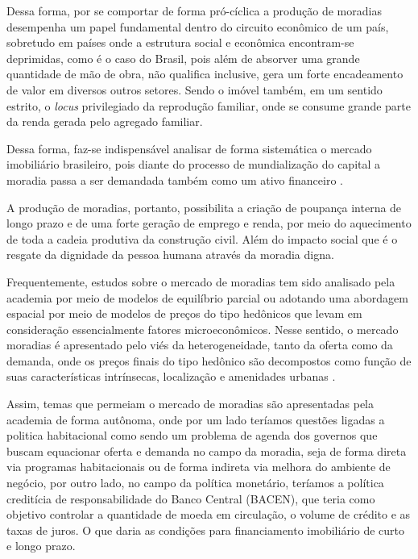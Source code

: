 Dessa forma, por se comportar de forma pró-cíclica a produção de moradias desempenha um papel fundamental dentro do circuito econômico de um país, sobretudo em países onde a estrutura social e econômica encontram-se deprimidas, como é o caso do Brasil, pois além de absorver uma grande quantidade de mão de obra, não qualifica inclusive, gera um forte encadeamento de valor em diversos outros setores. Sendo o imóvel também, em um sentido estrito, o \textit{locus} privilegiado da reprodução familiar, onde se consume grande parte da renda gerada pelo agregado familiar.

Dessa forma, faz-se indispensável analisar de forma sistemática o mercado imobiliário brasileiro, pois diante do processo de mundialização do capital \cite{CHESNAIS1996, Chesnais98} a moradia passa a ser demandada também como um ativo financeiro \cite{ROLNIK2015}.

A produção de moradias, portanto, possibilita a criação de poupança interna de longo prazo e de uma forte geração de emprego e renda, por meio do aquecimento de toda a cadeia produtiva da construção civil. Além do impacto social que é o resgate da dignidade da pessoa humana através da moradia digna.

Frequentemente, estudos sobre o mercado de moradias tem sido analisado pela academia por meio de modelos de equilíbrio parcial ou adotando uma abordagem espacial por meio de modelos de preços do tipo hedônicos que levam em consideração essencialmente fatores microeconômicos. Nesse sentido, o mercado moradias é apresentado pelo viés da heterogeneidade, tanto da oferta como da demanda, onde os preços finais do tipo hedônico são decompostos como função de suas características intrínsecas, localização e amenidades urbanas \cite{Lancaster1966}.

Assim, temas que permeiam o mercado de moradias são apresentadas pela academia de forma autônoma, onde por um lado teríamos questões ligadas a politica habitacional como sendo um problema de agenda dos governos que buscam equacionar oferta e demanda no campo da moradia, seja de forma direta via programas habitacionais ou de forma indireta via melhora do ambiente de negócio, por outro lado, no campo da política monetário, teríamos a política creditícia de responsabilidade do Banco Central (BACEN), que teria como objetivo controlar a quantidade de moeda em circulação, o volume de crédito e as taxas de juros.  O que daria as condições para financiamento imobiliário de curto e longo prazo.

